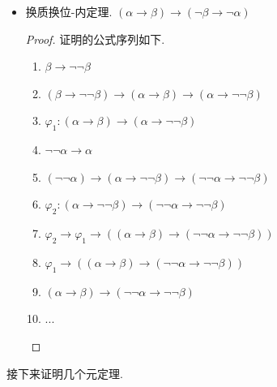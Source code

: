 \begin{itemize}
    \item 换质换位-内定理. \((\alpha \to \beta) \to (\neg \beta \to \neg \alpha)\)
    \begin{proof}
        证明的公式序列如下.
        \begin{enumerate}
            \item \(\beta \to \neg \neg \beta\)
            \item \((\beta \to \neg \neg \beta) \to (\alpha \to \beta) \to (\alpha \to \neg \neg \beta)\)
            \item \(\varphi_1: (\alpha \to \beta) \to (\alpha \to \neg \neg \beta)\)
            \item \(\neg \neg \alpha \to \alpha\)
            \item \((\neg \neg \alpha) \to (\alpha \to \neg \neg \beta) \to (\neg \neg \alpha \to \neg \neg \beta)\)
            \item \(\varphi_2: (\alpha \to \neg \neg \beta) \to (\neg \neg \alpha \to \neg \neg \beta)\)
            \item \(\varphi_2 \to \varphi_1 \to ((\alpha \to \beta) \to (\neg \neg \alpha \to \neg \neg \beta))\)
            \item \(\varphi_1 \to ((\alpha \to \beta) \to (\neg \neg \alpha \to \neg \neg \beta))\)
            \item \((\alpha \to \beta) \to (\neg \neg \alpha \to \neg \neg \beta)\)
            \item ...
        \end{enumerate}
    \end{proof}
    
\end{itemize}

接下来证明几个元定理.

